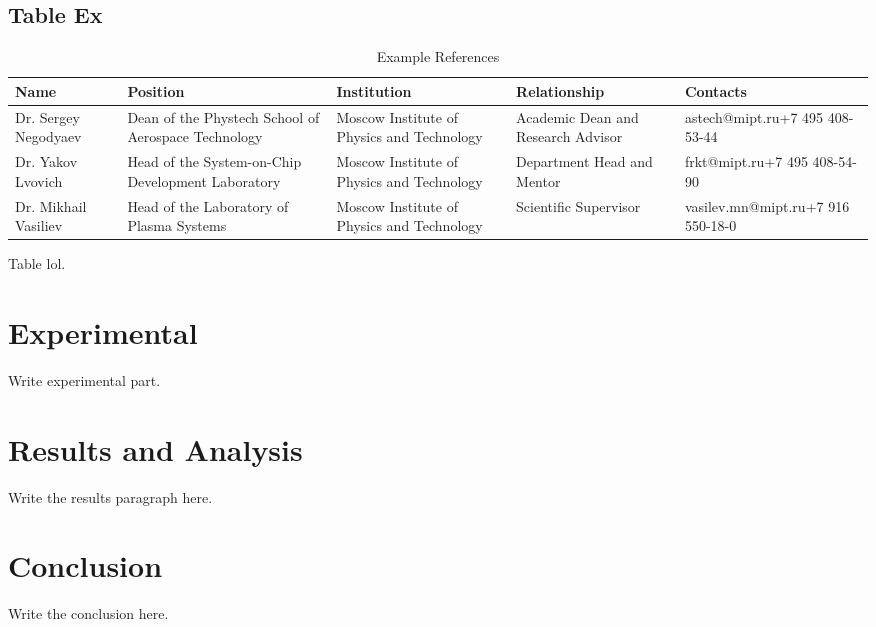 \documentclass[a4paper,12pt]{article}
\begin{document}
\subsection{Table Ex}
\begin{table}[htbp]
  \centering
  \small
  \renewcommand{\arraystretch}{1.5}
  \begin{tabularx}{\textwidth}{@{}>{\centering\arraybackslash}X>{\centering\arraybackslash}X>{\centering\arraybackslash}X>{\centering\arraybackslash}X>{\centering\arraybackslash}X@{}}
    \toprule
    \textbf{Name} & \textbf{Position} & \textbf{Institution} & \textbf{Relationship} & \textbf{Contacts} \\
    \midrule
    Dr. Sergey Negodyaev & Dean of the Phystech School of Aerospace Technology & Moscow Institute of Physics and Technology & Academic Dean and Research Advisor & astech@mipt.ru\newline +7 495 408-53-44 \\
    \midrule
    Dr. Yakov Lvovich & Head of the System-on-Chip Development Laboratory & Moscow Institute of Physics and Technology & Department Head and Mentor & frkt@mipt.ru\newline +7 495 408-54-90 \\
    \midrule
    Dr. Mikhail Vasiliev & Head of the Laboratory of Plasma Systems & Moscow Institute of Physics and Technology & Scientific Supervisor & vasilev.mn@mipt.ru\newline +7 916 550-18-0 \\
    \bottomrule
  \end{tabularx}
  \caption{Example References}
  \label{tab:example-references}
\end{table}

Table lol. 

\section{Experimental}
Write experimental part.

\section{Results and Analysis}
Write the results paragraph here.

\section{Conclusion}
Write the conclusion here.

\newpage

\nocite{Aliasgari_Renani_2023}
\printbibliography[heading=bibintoc,title={Bibliography}]
\end{document}
